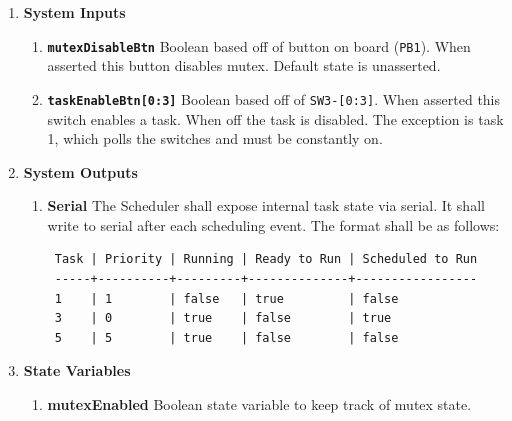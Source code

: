 \documentclass{article}
\newcommand{\bitem}[1]{\item \textbf{#1}}
\begin{document}
\begin{enumerate}
\bitem{System Inputs}
    \begin{enumerate}
    \bitem{\texttt{mutexDisableBtn}} Boolean based off of button on board (\texttt{PB1}). When asserted this button disables mutex. Default state is unasserted.
    \bitem{\texttt{taskEnableBtn[0:3]}} Boolean based off of \texttt{SW3-[0:3]}. When asserted this switch enables a task. When off the task is disabled. The exception is task 1, which polls the switches and must be constantly on.
    \end{enumerate}
\bitem{System Outputs}
    \begin{enumerate}
    \bitem{Serial} The Scheduler shall expose internal task state via serial. It shall write to serial after each scheduling event. The format shall be as follows:
        \begin{verbatim}
 Task | Priority | Running | Ready to Run | Scheduled to Run
 -----+----------+---------+--------------+-----------------
 1    | 1        | false   | true         | false
 3    | 0        | true    | false        | true
 5    | 5        | true    | false        | false
        \end{verbatim}
    \end{enumerate}
\bitem{State Variables}
    \begin{enumerate}
    \bitem{mutexEnabled} Boolean state variable to keep track of mutex state.
    \end{enumerate}

\newpage


\end{enumerate}
\end{document}
